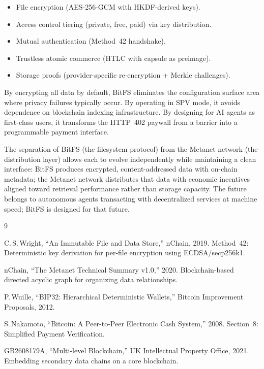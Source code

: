 \documentclass[11pt,a4paper]{article}
\begin{document}
\begin{itemize}
\item File encryption (AES-256-GCM with HKDF-derived keys).
\item Access control tiering (private, free, paid) via key distribution.
\item Mutual authentication (Method~42 handshake).
\item Trustless atomic commerce (HTLC with capsule as preimage).
\item Storage proofs (provider-specific re-encryption + Merkle challenges).
\end{itemize}

By encrypting all data by default, BitFS eliminates the configuration surface area where privacy failures typically occur. By operating in SPV mode, it avoids dependence on blockchain indexing infrastructure. By designing for AI agents as first-class users, it transforms the HTTP~402 paywall from a barrier into a programmable payment interface.

The separation of BitFS (the filesystem protocol) from the Metanet network (the distribution layer) allows each to evolve independently while maintaining a clean interface: BitFS produces encrypted, content-addressed data with on-chain metadata; the Metanet network distributes that data with economic incentives aligned toward retrieval performance rather than storage capacity. The future belongs to autonomous agents transacting with decentralized services at machine speed; BitFS is designed for that future.

\begin{thebibliography}{9}

C.\,S.\,Wright,
``An Immutable File and Data Store,''
nChain, 2019.
Method~42: Deterministic key derivation for per-file encryption using ECDSA/secp256k1.

nChain,
``The Metanet Technical Summary v1.0,''
2020.
Blockchain-based directed acyclic graph for organizing data relationships.

P.\,Wuille,
``BIP32: Hierarchical Deterministic Wallets,''
Bitcoin Improvement Proposals, 2012.

S.\,Nakamoto,
``Bitcoin: A Peer-to-Peer Electronic Cash System,''
2008.
Section~8: Simplified Payment Verification.

GB2608179A,
``Multi-level Blockchain,''
UK Intellectual Property Office, 2021.
Embedding secondary data chains on a core blockchain.

\end{thebibliography}
\end{document}
